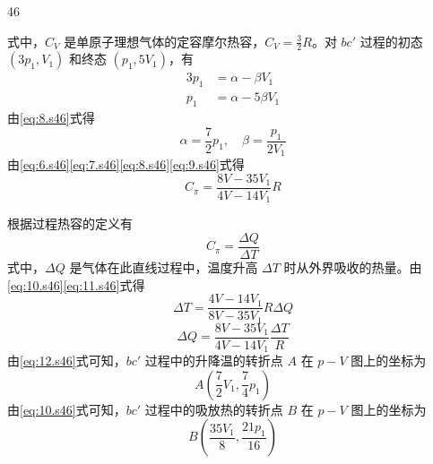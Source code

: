 \begin{solution}{46}
\begin{subsolution}
        式中，$C_{V}$ 是单原子理想气体的定容摩尔热容，$C_{V} = \frac{3}{2}R$。对 $bc'$ 过程的初态 $(3p_{1}, V_{1})$ 和终态 $(p_{1}, 5V_{1})$，有
        \begin{equation}
            \begin{aligned}
                3p_{1} &= \alpha - \beta V_{1} \\
                p_{1} &= \alpha - 5\beta V_{1}
            \end{aligned}
            \label{eq:8.s46}
        \end{equation}
        由\eqref{eq:8.s46}式得
        \begin{equation}
            \alpha = \frac{7}{2}p_{1},\quad \beta = \frac{p_{1}}{2V_{1}}
            \label{eq:9.s46}
        \end{equation}
        由\eqref{eq:6.s46}\eqref{eq:7.s46}\eqref{eq:8.s46}\eqref{eq:9.s46}式得
        \begin{equation}
            C_{\pi} = \frac{8V - 35V_{1}}{4V - 14V_{1}}R
            \label{eq:10.s46}
        \end{equation}
    \end{subsolution}
    \begin{subsolution}
        根据过程热容的定义有
        \begin{equation}
            C_{\pi} = \frac{\Delta Q}{\Delta T}
            \label{eq:11.s46}
        \end{equation}
        式中，$\Delta Q$ 是气体在此直线过程中，温度升高 $\Delta T$ 时从外界吸收的热量。由\eqref{eq:10.s46}\eqref{eq:11.s46}式得
        \begin{equation}
            \Delta T = \frac{4V - 14V_{1}}{8V - 35V_{1}}R\Delta Q
            \label{eq:12.s46}
        \end{equation}
        \begin{equation}
            \Delta Q = \frac{8V - 35V_{1}}{4V - 14V_{1}}\frac{\Delta T}{R}
            \label{eq:13.s46}
        \end{equation}
        由\eqref{eq:12.s46}式可知，$bc'$ 过程中的升降温的转折点 $A$ 在 $p-V$ 图上的坐标为
        \begin{equation}
            A\left(\frac{7}{2}V_{1}, \frac{7}{4}p_{1}\right)
            \label{eq:14.s46}
        \end{equation}
        由\eqref{eq:10.s46}式可知，$bc'$ 过程中的吸放热的转折点 $B$ 在 $p-V$ 图上的坐标为
        \begin{equation}
            B\left(\frac{35V_{1}}{8}, \frac{21p_{1}}{16}\right)

\end{equation}
\end{subsolution}
\end{solution}
